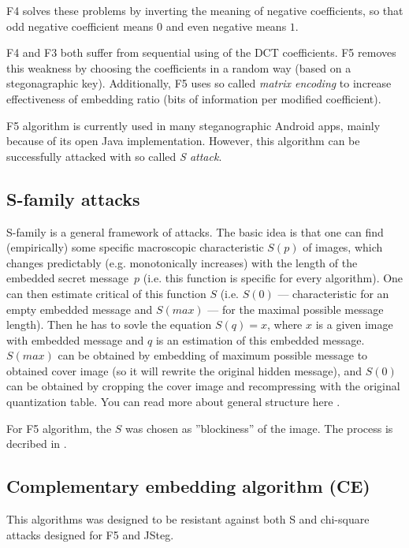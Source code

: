 F4 solves these problems by inverting the meaning of negative coefficients, so that odd negative coefficient means $0$
and even negative means $1$.

F4 and F3 both suffer from sequential using of the DCT coefficients. F5 removes this weakness by choosing the coefficients
in a random way (based on a stegonagraphic key). Additionally, F5 uses so called \emph{matrix encoding} to increase effectiveness
of embedding ratio (bits of information per modified coefficient).

F5 algorithm is currently used in many steganographic Android apps, mainly because of its open Java implementation. However, this
algorithm can be successfully attacked with so called \emph{S attack}.


\subsection{S-family attacks}

S-family is a general framework of attacks. The basic idea is that one can find (empirically) some specific macroscopic 
characteristic $S(p)$ of images, which changes predictably (e.g. monotonically increases) 
with the length of the embedded secret message~$p$ (i.e. this function is specific for every algorithm). 
One can then estimate critical of this function $S$ (i.e. $S(0)$ --- characteristic for an empty embedded message and
$S(max)$ --- for the maximal possible message length). Then he has to sovle the equation $S(q) = x$, where $x$ is a given
image with embedded message and $q$ is an estimation of this embedded message. $S(max)$ can be obtained by embedding of
maximum possible message to obtained cover image (so it will rewrite the original hidden message), and $S(0)$ can be obtained
by cropping the cover image and recompressing with the original quantization table. You can read more about general structure
here \cite{fridrich2002attacking}.

For F5 algorithm, the $S$ was chosen as ''blockiness'' of the image. The process is decribed in \cite{fridrich2002steganalysis}.

\subsection{Complementary embedding algorithm (CE)}

This algorithms was designed to be resistant against both S and chi-square attacks designed for F5 and JSteg.


